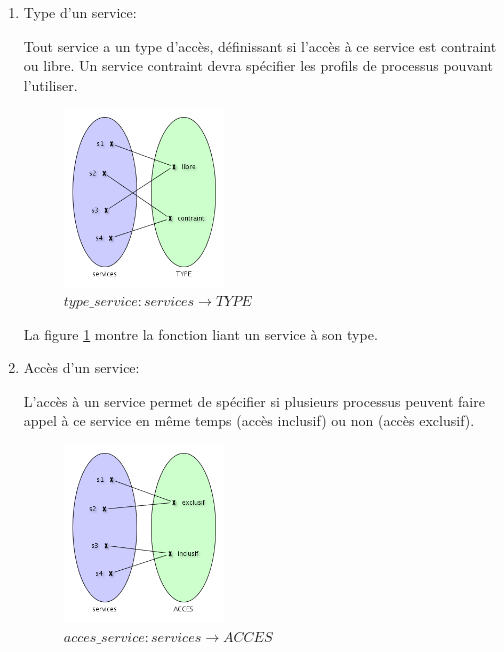 \documentclass[french, titlepage, 10pt, a4paper]{article}
\begin{document}
\begin{enumerate}

  \item Type d'un service:

    Tout service a un type d'accès, définissant si l'accès à ce service est
    contraint ou libre.
    Un service contraint devra spécifier les profils de processus pouvant
    l'utiliser.

    \begin{figure}[htb]
      \centering
      \includegraphics[width=0.4\textwidth]{type_service.png}
      \caption{$type\_service: services \rightarrow TYPE$}
      \label{fig:type_service}
    \end{figure}

    La figure \ref{fig:type_service} montre la fonction liant un service à son
    type.

  \item Accès d'un service:

    L'accès à un service permet de spécifier si plusieurs processus peuvent
    faire appel à ce service en même temps (accès inclusif) ou non (accès
    exclusif).

    \begin{figure}[htb]
      \centering
      \includegraphics[width=0.4\textwidth]{acces_service.png}
      \caption{$acces\_service: services \rightarrow ACCES$}
      \label{fig:acces_service}
    \end{figure}


\end{enumerate}
\end{document}
